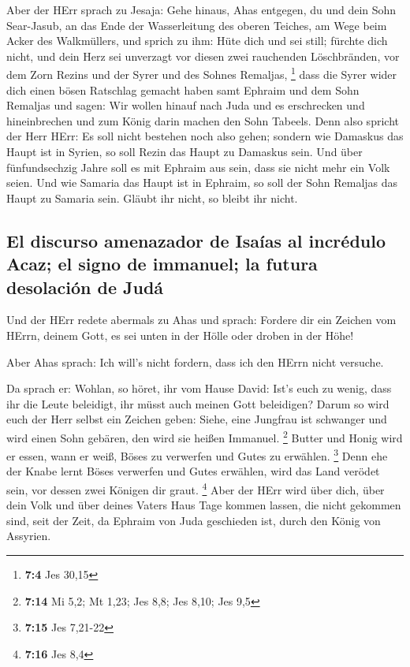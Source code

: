  Aber der HErr sprach zu Jesaja: Gehe hinaus, Ahas
entgegen, du und dein Sohn Sear-Jasub, an das Ende der Wasserleitung des
oberen Teiches, am Wege beim Acker des Walkmüllers,  und
sprich zu ihm: Hüte dich und sei still; fürchte dich nicht, und dein
Herz sei unverzagt vor diesen zwei rauchenden Löschbränden, vor dem Zorn
Rezins und der Syrer und des Sohnes Remaljas, \footnote{\textbf{7:4} Jes
  30,15}  dass die Syrer wider dich einen bösen Ratschlag
gemacht haben samt Ephraim und dem Sohn Remaljas und sagen:
 Wir wollen hinauf nach Juda und es erschrecken und
hineinbrechen und zum König darin machen den Sohn Tabeels.
 Denn also spricht der Herr HErr: Es soll nicht bestehen
noch also gehen;  sondern wie Damaskus das Haupt ist in
Syrien, so soll Rezin das Haupt zu Damaskus sein. Und über
fünfundsechzig Jahre soll es mit Ephraim aus sein, dass sie nicht mehr
ein Volk seien.  Und wie Samaria das Haupt ist in Ephraim,
so soll der Sohn Remaljas das Haupt zu Samaria sein. Gläubt ihr nicht,
so bleibt ihr nicht.

\hypertarget{el-discurso-amenazador-de-isauxedas-al-incruxe9dulo-acaz-el-signo-de-immanuel-la-futura-desolaciuxf3n-de-juduxe1}{%
\subsection{El discurso amenazador de Isaías al incrédulo Acaz; el signo
de immanuel; la futura desolación de
Judá}\label{el-discurso-amenazador-de-isauxedas-al-incruxe9dulo-acaz-el-signo-de-immanuel-la-futura-desolaciuxf3n-de-juduxe1}}

 Und der HErr redete abermals zu Ahas und sprach:
 Fordere dir ein Zeichen vom HErrn, deinem Gott, es sei
unten in der Hölle oder droben in der Höhe!

 Aber Ahas sprach: Ich will's nicht fordern, dass ich den
HErrn nicht versuche.

 Da sprach er: Wohlan, so höret, ihr vom Hause David:
Ist's euch zu wenig, dass ihr die Leute beleidigt, ihr müsst auch meinen
Gott beleidigen?  Darum so wird euch der Herr selbst ein
Zeichen geben: Siehe, eine Jungfrau ist schwanger und wird einen Sohn
gebären, den wird sie heißen Immanuel. \footnote{\textbf{7:14} Mi 5,2;
  Mt 1,23; Jes 8,8; Jes 8,10; Jes 9,5}  Butter und Honig
wird er essen, wann er weiß, Böses zu verwerfen und Gutes zu erwählen.
\footnote{\textbf{7:15} Jes 7,21-22}  Denn ehe der Knabe
lernt Böses verwerfen und Gutes erwählen, wird das Land verödet sein,
vor dessen zwei Königen dir graut. \footnote{\textbf{7:16} Jes 8,4}
 Aber der HErr wird über dich, über dein Volk und über
deines Vaters Haus Tage kommen lassen, die nicht gekommen sind, seit der
Zeit, da Ephraim von Juda geschieden ist, durch den König von Assyrien.


